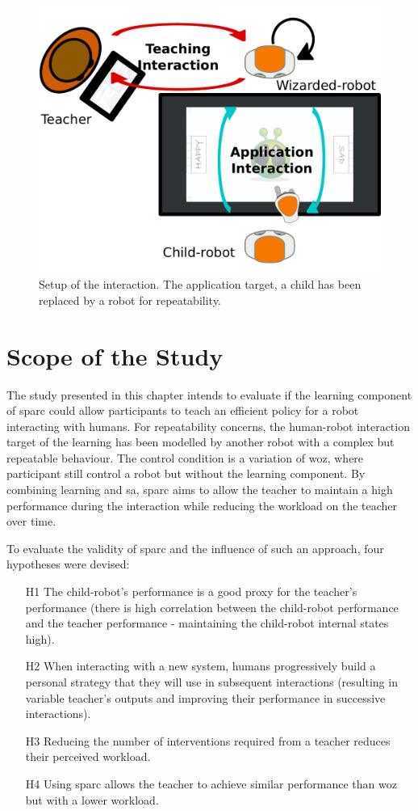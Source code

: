 \begin{figure}[ht]
	\centering
	\includegraphics[width=.8\textwidth]{setup_diag.pdf}
	\caption{Setup of the interaction. The application target, a child has been replaced by a robot for repeatability.}
	\label{fig:woz_setup_diag}
\end{figure}

\section{Scope of the Study}
The study presented in this chapter intends to evaluate if the learning component of \gls{sparc} could allow participants to teach an efficient policy for a robot interacting with humans. For repeatability concerns, the human-robot interaction target of the learning has been modelled by another robot with a complex but repeatable behaviour. The control condition is a variation of \gls{woz}, where participant still control a robot but without the learning component. By combining learning and \gls{sa}, \gls{sparc} aims to allow the teacher to maintain a high performance during the interaction while reducing the workload on the teacher over time.

To evaluate the validity of \gls{sparc} and the influence of such an approach, four hypotheses were devised:
\begin{enumerate}
	\item [H1] The child-robot's performance is a good proxy for the teacher's performance (there is high correlation between the child-robot performance and the teacher performance - maintaining the child-robot internal states high).
	\item [H2] When interacting with a new system, humans progressively build a personal strategy that they will use in subsequent interactions (resulting in variable teacher's outputs and improving their performance in successive interactions).
	\item [H3] Reducing the number of interventions required from a teacher reduces their perceived workload.
	\item [H4] Using \gls{sparc} allows the teacher to achieve similar performance than \gls{woz} but with a lower workload.
\end{enumerate}


